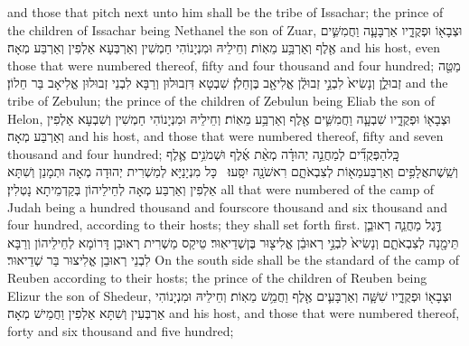 {and those that pitch next unto him shall be the tribe of Issachar; the prince of the children of Issachar being Nethanel the son of Zuar,}{}
{וּצְבָא֖וֹ וּפְקֻדָ֑יו אַרְבָּעָ֧ה וַחֲמִשִּׁ֛ים אֶ֖לֶף וְאַרְבַּ֥ע מֵאֽוֹת׃}
{וְחֵילֵיהּ וּמִנְיָנוֹהִי חַמְשִׁין וְאַרְבְּעָא אַלְפִין וְאַרְבַּע מְאָה׃}
{and his host, even those that were numbered thereof, fifty and four thousand and four hundred;}{}
{מַטֵּ֖ה זְבוּלֻ֑ן וְנָשִׂיא֙ לִבְנֵ֣י זְבוּלֻ֔ן אֱלִיאָ֖ב בֶּן\maqqaf חֵלֹֽן׃}
{שִׁבְטָא דִּזְבוּלוּן וְרַבָּא לִבְנֵי זְבוּלוּן אֱלִיאָב בַּר חֵלוֹן׃}
{and the tribe of Zebulun; the prince of the children of Zebulun being Eliab the son of Helon,}{}
{וּצְבָא֖וֹ וּפְקֻדָ֑יו שִׁבְעָ֧ה וַחֲמִשִּׁ֛ים אֶ֖לֶף וְאַרְבַּ֥ע מֵאֽוֹת׃}
{וְחֵילֵיהּ וּמִנְיָנוֹהִי חַמְשִׁין וְשִׁבְעָא אַלְפִין וְאַרְבַּע מְאָה׃}
{and his host, and those that were numbered thereof, fifty and seven thousand and four hundred;}{}
{כׇּֽל\maqqaf הַפְּקֻדִ֞ים לְמַחֲנֵ֣ה יְהוּדָ֗ה מְאַ֨ת אֶ֜לֶף וּשְׁמֹנִ֥ים אֶ֛לֶף וְשֵֽׁשֶׁת\maqqaf אֲלָפִ֥ים וְאַרְבַּע\maqqaf מֵא֖וֹת לְצִבְאֹתָ֑ם רִאשֹׁנָ֖ה יִסָּֽעוּ׃ \setuma }
{כָּל מִנְיָנַיָּא לְמַשְׁרִית יְהוּדָה מְאָה וּתְמָנַן וְשִׁתָּא אַלְפִין וְאַרְבַּע מְאָה לְחֵילֵיהוֹן בְּקַדְמֵיתָא נָטְלִין׃}
{all that were numbered of the camp of Judah being a hundred thousand and fourscore thousand and six thousand and four hundred, according to their hosts; they shall set forth first.}{}
{דֶּ֣גֶל מַחֲנֵ֧ה רְאוּבֵ֛ן תֵּימָ֖נָה לְצִבְאֹתָ֑ם וְנָשִׂיא֙ לִבְנֵ֣י רְאוּבֵ֔ן אֱלִיצ֖וּר בֶּן\maqqaf שְׁדֵיאֽוּר׃}
{טֵיקַס מַשְׁרִית רְאוּבֵן דָּרוֹמָא לְחֵילֵיהוֹן וְרַבָּא לִבְנֵי רְאוּבֵן אֱלִיצוּר בַּר שְׁדֵיאוּר׃}
{On the south side shall be the standard of the camp of Reuben according to their hosts; the prince of the children of Reuben being Elizur the son of Shedeur,}{}
{וּצְבָא֖וֹ וּפְקֻדָ֑יו שִׁשָּׁ֧ה וְאַרְבָּעִ֛ים אֶ֖לֶף וַחֲמֵ֥שׁ מֵאֽוֹת׃}
{וְחֵילֵיהּ וּמִנְיָנוֹהִי אַרְבְּעִין וְשִׁתָּא אַלְפִין וַחֲמֵישׁ מְאָה׃}
{and his host, and those that were numbered thereof, forty and six thousand and five hundred;}{}
